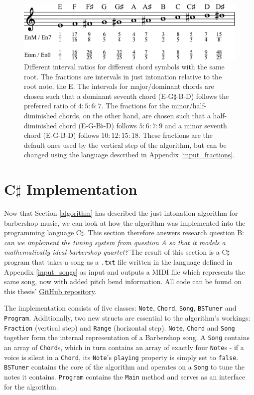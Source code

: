 \documentclass[a4paper]{article}
\begin{document}
\begin{figure}
	\centering
	\includegraphics[width=\textwidth]{Figures/fractions.pdf}
	\caption{Different interval ratios for different chord symbols with the same root. The fractions are intervals in just intonation relative to the root note, the E. The intervals for major/dominant chords are chosen such that a dominant seventh chord (E-G$\sharp$-B-D) follows the preferred ratio of $4:5:6:7$. The fractions for the minor/half-diminished chords, on the other hand, are chosen such that a half-diminished chord (E-G-B$\flat$-D) follows $5:6:7:9$ and a minor seventh chord (E-G-B-D) follows $10:12:15:18$. These fractions are the default ones used by the vertical step of the algorithm, but can be changed using the language described in Appendix \ref{input_fractions}.}
	\label{fig:fractions}
\end{figure}

\section{C$\sharp$ Implementation}
\label{implementation}
Now that Section \ref{algorithm} has described the just intonation algorithm for barbershop music, we can look at how the algorithm was implemented into the programming language C$\sharp$. This section therefore answers research question B: {\it can we implement the tuning system from question A so that it models a mathematically ideal barbershop quartet?} The result of this section is a C$\sharp$ program that takes a song as a \texttt{.txt} file written in the language defined in Appendix \ref{input_songs} as input and outputs a MIDI file which represents the same song, now with added pitch bend information. All code can be found on this thesis' \href{https://GitHub.com/teuncb/AdaptiveBarbershop}{GitHub repository}.

The implementation consists of five classes: \texttt{Note}, \texttt{Chord}, \texttt{Song}, \texttt{BSTuner} and \texttt{Program}. Additionally, two new structs are essential to the algorithm's workings: \texttt{Fraction} (vertical step) and \texttt{Range} (horizontal step). \texttt{Note}, \texttt{Chord} and \texttt{Song} together form the internal representation of a Barbershop song. A \texttt{Song} contains an array of \texttt{Chord}s, which in turn contains an array of exactly four \texttt{Note}s - if a voice is silent in a \texttt{Chord}, its \texttt{Note}'s \texttt{playing} property is simply set to \texttt{false}. \texttt{BSTuner} contains the core of the algorithm and operates on a \texttt{Song} to tune the notes it contains. \texttt{Program} contains the \texttt{Main} method and serves as an interface for the algorithm.
\end{document}
